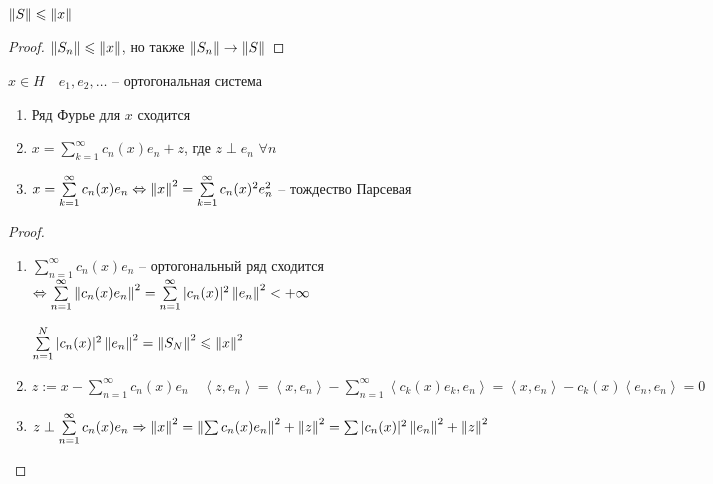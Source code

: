 \begin{consequence}\thmslashn
	
	$\left\|S\right\| \leqslant \left\|x\right\|$
	
\end{consequence}

\begin{proof}\thmslashn
	
	$\left\|S_n\right\| \leqslant \left\|x\right\|$, но также $\left\|S_n\right\| \to \left\|S\right\|$
	
\end{proof}

\begin{theorem}\thmslashn 
	
	$x \in H \quad e_1, e_2, \ldots$ -- ортогональная система
	
	\begin{enumerate}
		\item 
		Ряд Фурье для $x$ сходится
		
		\item
		$x = \sum\limits_{k = 1}^\infty c_n(x)e_n + z$, где $z \perp e_n \,\,\forall n$
		
		\item
		$x = \sum\limits_{k = 1}^\infty c_n(x)e_n \Leftrightarrow \left\|x\right\|^2 = \sum\limits_{k = 1}^\infty c_n(x)^2e_n^2$ -- тождество Парсевая
		
	\end{enumerate}
\end{theorem}

\begin{proof}\thmslashn
	
	\begin{enumerate}
		\item 
		$\sum\limits_{n = 1}^\infty c_n(x)e_n$ -- ортогональный ряд сходится $\Leftrightarrow \sum\limits_{n = 1}^\infty \left\|c_n(x)e_n\right\|^2 = \sum\limits_{n = 1}^\infty |c_n(x)|^2\left\|e_n\right\|^2 < +\infty$
		
		$\sum\limits_{n = 1}^N |c_n(x)|^2 \left\|e_n\right\|^2 = \left\|S_N\right\|^2 \leqslant \left\|x\right\|^2$
		
		\item
		$z := x - \sum\limits_{n = 1}^\infty c_n(x)e_n \quad \left\langle z, e_n \right\rangle = \left\langle x, e_n \right\rangle -  \sum\limits_{n = 1}^\infty \left\langle c_k(x)e_k, e_n \right\rangle = \left\langle x, e_n \right\rangle -  c_k(x) \left\langle e_n, e_n \right\rangle = 0$
		
		\item
		$z \perp \sum\limits_{n = 1}^\infty c_n(x)e_n \Rightarrow \left\|x\right\|^2 = \left\|\sum c_n(x)e_n\right\|^2 + \left\|z\right\|^2 = \sum |c_n(x)|^2\left\|e_n\right\|^2 + \left\|z\right\|^2$ 
		
	\end{enumerate}	
	
\end{proof}

